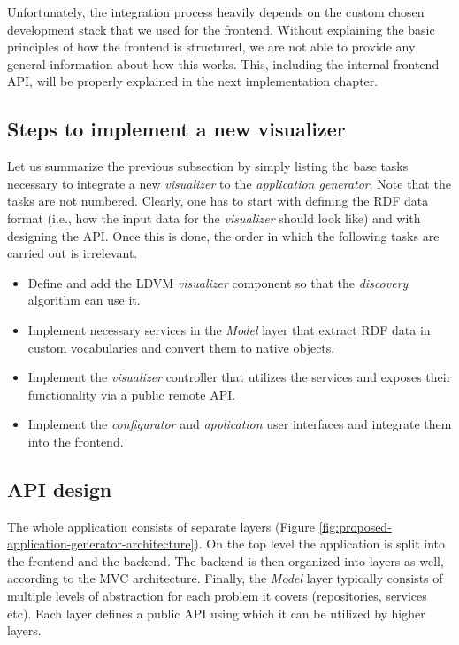 Unfortunately, the integration process heavily depends on the custom chosen development stack that we used for the frontend. Without explaining the basic principles of how the frontend is structured, we are not able to provide any general information about how this works. This, including the internal frontend API, will be properly explained in the next implementation chapter.

\subsection{Steps to implement a new visualizer}

Let us summarize the previous subsection by simply listing the base tasks necessary to integrate a new \emph{visualizer} to the \emph{application generator}. Note that the tasks are not numbered. Clearly, one has to start with defining the RDF data format (i.e., how the input data for the \emph{visualizer} should look like) and with designing the API. Once this is done, the order in which the following tasks are carried out is irrelevant.

\begin{itemize}
\item Define and add the LDVM \emph{visualizer} component so that the \emph{discovery} algorithm can use it.
\item Implement necessary services in the \emph{Model} layer that extract RDF data in custom vocabularies and convert them to native objects.
\item Implement the \emph{visualizer} controller that utilizes the services and exposes their functionality via a public remote API.
\item Implement the \emph{configurator} and \emph{application} user interfaces and integrate them into the frontend. 
\end{itemize}

\subsection{API design}

The whole application consists of separate layers (Figure \ref{fig:proposed-application-generator-architecture}). On the top level the application is split into the frontend and the backend. The backend is then organized into layers as well, according to the MVC architecture. Finally, the \emph{Model} layer typically consists of multiple levels of abstraction for each problem it covers (repositories, services etc). Each layer defines a public API using which it can be utilized by higher layers.

